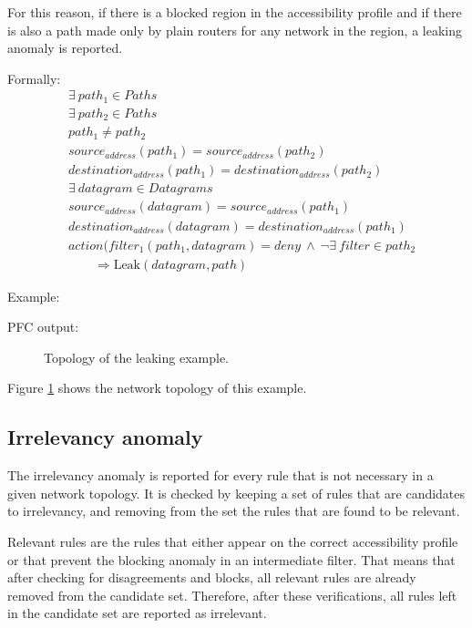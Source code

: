 For this reason, if there is a blocked region in the accessibility profile and
if there is also a path made only by plain routers for any network in the region, a
leaking anomaly is reported.

Formally:
\begin{align*}
	& \exists ~ path_1 \in Paths \\
	& \exists ~ path_2 \in Paths \\
	& path_1 \not= path_2 \\
	& source_{address}(path_1) = source_{address}(path_2) \\
	& destination_{address}(path_1) = destination_{address}(path_2) \\
	& \exists ~ datagram \in Datagrams \\
	& source_{address}(datagram) = source_{address}(path_1) \\
	& destination_{address}(datagram) = destination_{address}(path_1) \\
	& action(filter_1(path_1, datagram) = deny ~ \wedge ~ \lnot\exists ~ filter \in path_2 \\
	& \qquad \Rightarrow \mbox{Leak}(datagram, path)
\end{align*}

Example:



PFC output:



\begin{figure}
	\caption{\label{fig:exleak:topo}Topology of the leaking example.}
\end{figure}

Figure \ref{fig:exleak:topo} shows the network topology of this example.



\subsection{Irrelevancy anomaly}

The irrelevancy anomaly is reported for every rule that is not necessary in a given
network topology. It is checked by keeping a set of rules that
are candidates to irrelevancy, and removing from the set the rules that are
found to be relevant.

Relevant rules are the rules that either appear on the correct accessibility
profile or that prevent the blocking anomaly in an intermediate filter. That
means that after checking for disagreements and blocks, all relevant rules are
already removed from the candidate set. Therefore, after these verifications,
all rules left in the candidate set are reported as irrelevant.

